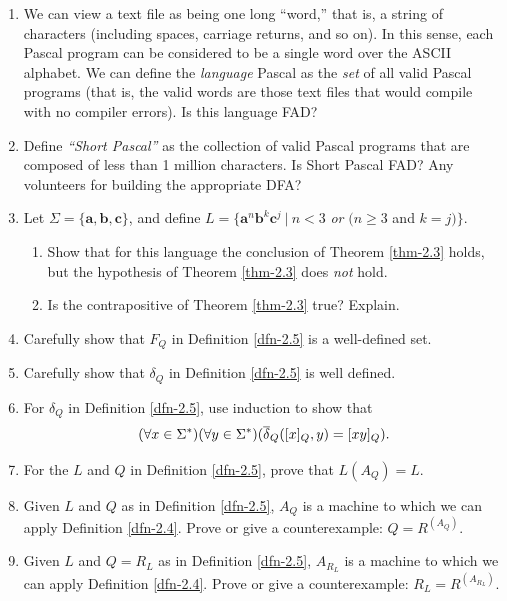 \begin{enumerate}[{2.}1.]
\item We can view a text file as being one long ``word,'' that is, a string of
characters (including spaces, carriage returns, and so on). In this sense, each
Pascal program can be considered to be a single word over the ASCII alphabet. We
can define the \emph{language} Pascal as the \emph{set} of all valid Pascal
programs (that is, the valid words are those text files that would compile with
no compiler errors). Is this language FAD?

\item Define \emph{``Short Pascal''} as the collection of valid Pascal programs
that are composed of less than 1 million characters. Is Short Pascal FAD? Any
volunteers for building the appropriate DFA?

\item Let $\Sigma=\{\pmb{a},\pmb{b},\pmb{c}\}$, and define $L=\{\pmb{a}^n
\pmb{b}^k\pmb{c}^j\ |\  n < 3$ \emph{ or } $(n \geq 3$ and $k = j)\}$.
\begin{enumerate}
\item Show that for this language the conclusion of Theorem \ref{thm-2.3} holds, but the
hypothesis of Theorem \ref{thm-2.3} does \emph{not} hold.
\item Is the contrapositive of Theorem \ref{thm-2.3} true? Explain.
\end{enumerate}

\item Carefully show that $F_Q$ in Definition \ref{dfn-2.5} is a well-defined set.

\item Carefully show that $\delta_Q$ in Definition \ref{dfn-2.5} is well defined.

\item For $\delta_Q$ in Definition \ref{dfn-2.5}, use induction to show that
\[ (\forall x \in \Sigma^*)(\forall y \in \Sigma^*)(\overline{\delta}_Q([x]_Q,y) =
	[xy]_Q). \]

\item For the $L$ and $Q$ in Definition \ref{dfn-2.5}, prove that $L(A_Q) = L$.

\item Given $L$ and $Q$ as in Definition \ref{dfn-2.5}, $A_Q$ is a machine to which we can
apply Definition \ref{dfn-2.4}. Prove or give a counterexample: $Q = R^{(A_Q)}$.

\item Given $L$ and $Q = R_L$ as in Definition \ref{dfn-2.5}, $A_{R_L}$ is a machine to
which we can apply Definition \ref{dfn-2.4}. Prove or give a counterexample: $R_L =
R^{(A_{R_L})}$.


\end{enumerate}
